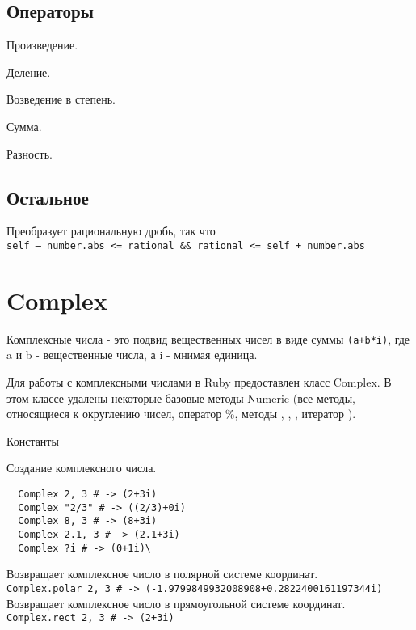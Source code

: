 \subsection*{Операторы} 

\begin{methodlist}
  Произведение. 
 
  Деление. 
 
  Возведение в степень. 
 
  Сумма. 
 
  Разность. 
\end{methodlist}

\subsection*{Остальное} 

\begin{methodlist}
  Преобразует рациональную дробь, так что 
  \\\verb!self – number.abs <= rational && rational <= self + number.abs!
\end{methodlist}

\section{Complex}

Комплексные числа - это подвид вещественных чисел в виде суммы \verb!(a+b*i)!, где a и b - вещественные числа, а i - мнимая единица.

Для работы с комплексными числами в Ruby предоставлен класс Complex. В этом классе удалены некоторые базовые методы Numeric (все методы, относящиеся к округлению чисел, оператор \%, методы , , , итератор ).

\begin{keylist}{Константы}
\end{keylist} 

\begin{methodlist}
  Создание комплексного числа.
  \begin{verbatim}
  Complex 2, 3 # -> (2+3i) 
  Complex "2/3" # -> ((2/3)+0i) 
  Complex 8, 3 # -> (8+3i) 
  Complex 2.1, 3 # -> (2.1+3i) 
  Complex ?i # -> (0+1i)\
  \end{verbatim}

  Возвращает комплексное число в полярной системе координат. 
  \\\verb!Complex.polar 2, 3 # -> (-1.9799849932008908+0.2822400161197344i)!
  \declare{::rect( real, imag = nil )}{\# -> complex} 
  Возвращает комплексное число в прямоугольной системе координат. 
  \\\verb!Complex.rect 2, 3 # -> (2+3i)!
\end{methodlist}

